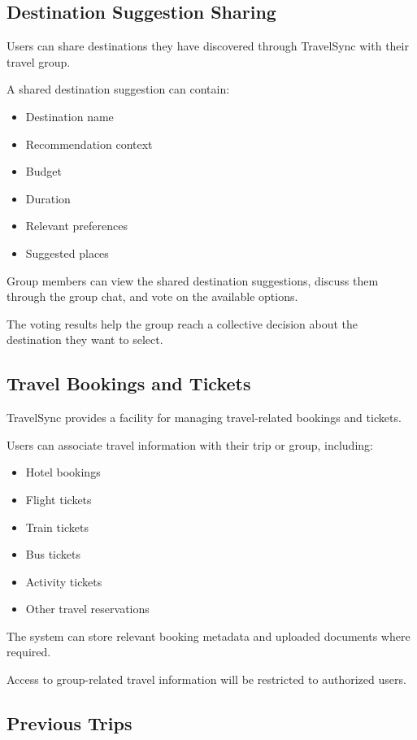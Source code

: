\documentclass[11pt,a4paper]{article}
\begin{document}
\subsection{Destination Suggestion Sharing}

Users can share destinations they have discovered through TravelSync with their travel group.

A shared destination suggestion can contain:

\begin{itemize}
\item Destination name
\item Recommendation context
\item Budget
\item Duration
\item Relevant preferences
\item Suggested places
\end{itemize}

Group members can view the shared destination suggestions, discuss them through the group chat, and vote on the available options.

The voting results help the group reach a collective decision about the destination they want to select.


\subsection{Travel Bookings and Tickets}

TravelSync provides a facility for managing travel-related bookings and tickets.

Users can associate travel information with their trip or group, including:

\begin{itemize}
\item Hotel bookings
\item Flight tickets
\item Train tickets
\item Bus tickets
\item Activity tickets
\item Other travel reservations
\end{itemize}

The system can store relevant booking metadata and uploaded documents where required.

Access to group-related travel information will be restricted to authorized users.


\subsection{Previous Trips}
\end{document}
